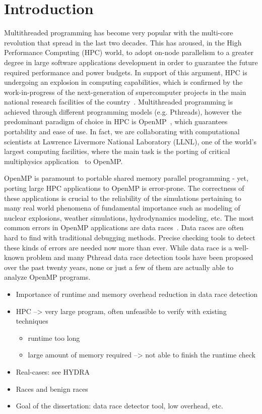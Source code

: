 \section{Introduction}
\label{sec:introduction}

Multithreaded programming has become very popular with the multi-core
revolution that spread in the last two decades.
%
This has aroused, in the High Performance Computing (HPC) world, to adopt
on-node parallelism to a greater degree in large software applications
development in order to guarantee the future required performance and power
budgets.
%
In support of this argument, HPC is undergoing an explosion in
computing capabilities, which is confirmed by the work-in-progress of the
next-generation of supercomputer projects in the main national research
facilities of the country~\cite{sierra, summit, trinity}.
%
Multithreaded programming is achieved through different programming models
(e.g. Pthreads), however the predominant paradigm of choice in HPC is
OpenMP~\cite{ompdoc}, which guarantees portability and ease of use.
%
In fact, we are collaborating with computational scientists at Lawrence
Livermore National Laboratory (LLNL), one of the world's largest computing
facilities, where the main task is the porting of critical multiphysics
application~\cite{llnl-apps} to OpenMP.

OpenMP is paramount to portable shared memory parallel programming - yet,
porting large HPC applications to OpenMP is error-prone.
%
The correctness of these applications is crucial to the reliability of the
simulations pertaining to many real world phenomena of fundamental importance
such as modeling of nuclear explosions, weather simulations, hydrodynamics
modeling, etc.
%
The most common errors in OpenMP applications are data
races~\cite{sus_common_2008}.
%
Data races are often hard to find with traditional debugging methods.
%
Precise checking tools to detect these kinds of errors are needed now more
than ever.
%
While data race is a well-known problem and many Pthread data race detection
tools have been proposed over the past twenty years, none or just a few of
them are actually able to analyze OpenMP programs.

\begin{itemize}
  \item Importance of runtime and memory overhead reduction in data race
    detection
  \item HPC --> very large program, often unfeasible to verify with
    existing techniques
    \begin{itemize}
    \item runtime too long
    \item large amount of memory required --> not able to finish the
      runtime check
    \end{itemize}
  \item Real-cases: see HYDRA
  \item Races and benign races
  \item Goal of the dissertation: data race detector tool, low overhead, etc.
\end{itemize}

